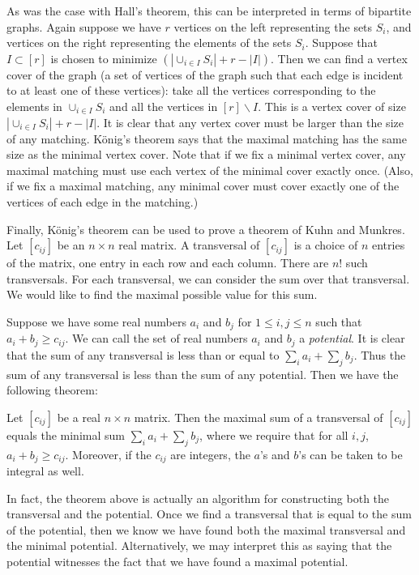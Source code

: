As was the case with Hall's theorem, this can be interpreted in terms of bipartite graphs. Again suppose we have $r$ vertices on the left representing the sets $S_i$, and vertices on the right representing the elements of the sets $S_i$. Suppose that $I \subset [r]$ is chosen to minimize $\left( \left| \cup_{i\in I} S_i \right| + r - |I| \right).$ Then we can find a vertex cover of the graph (a set of vertices of the graph such that each edge is incident to at least one of these vertices): take all the vertices corresponding to the elements in $\cup_{i\in I} S_i$ and all the vertices in $[r] \backslash I$. This is a vertex cover of size $\left| \cup_{i\in I} S_i \right| + r - |I|$. It is clear that any vertex cover must be larger than the size of any matching. K{\"o}nig's theorem says that the maximal matching has the same size as the minimal vertex cover. Note that if we fix a minimal vertex cover, any maximal matching must use each vertex of the minimal cover exactly once. (Also, if we fix a maximal matching, any minimal cover must cover exactly one of the vertices of each edge in the matching.)

Finally, K{\"o}nig's theorem can be used to prove a theorem of Kuhn and Munkres. Let $[c_{ij}]$ be an $n \times n$ real matrix. A transversal of $[c_{ij}]$ is a choice of $n$ entries of the matrix, one entry in each row and each column. There are $n!$ such transversals. For each transversal, we can consider the sum over that transversal. We would like to find the maximal possible value for this sum.

Suppose we have some real numbers $a_i$ and $b_j$ for $1 \leq i,j \leq n$ such that $a_i + b_j \geq c_{ij}$. We can call the set of real numbers $a_i$ and $b_j$ a \emph{potential}. It is clear that the sum of any transversal is less than or equal to $\sum_i a_i + \sum_j b_j$. Thus the sum of any transversal is less than the sum of any potential. Then we have the following theorem:

\begin{theorem} \label{comb3}
Let $[c_{ij}]$ be a real $n\times n$ matrix. Then the maximal sum of a transversal of $[c_{ij}]$ equals the minimal sum $\sum_i a_i + \sum_j b_j$, where we require that for all $i, j$, $a_i + b_j \geq c_{ij}$. Moreover, if the $c_{ij}$ are integers, the $a$'s and $b$'s can be taken to be integral as well.
\end{theorem}

In fact, the theorem above is actually an algorithm for constructing both the transversal and the potential. Once we find a transversal that is equal to the sum of the potential, then we know we have found both the maximal transversal and the minimal potential. Alternatively, we may interpret this as saying that the potential witnesses the fact that we have found a maximal potential.

